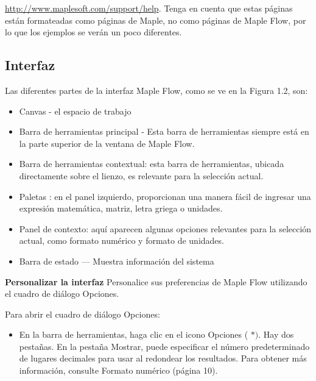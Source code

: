 \href{http://www.maplesoft.com/support/help}{http://www.maplesoft.com/support/help}. Tenga en cuenta que estas páginas están formateadas como páginas de Maple, no como páginas de Maple Flow, por lo que los ejemplos se verán un poco diferentes.

\subsection{Interfaz}
Las diferentes partes de la interfaz Maple Flow, como se ve en la Figura 1.2, son:

\begin{itemize}
  \item Canvas - el espacio de trabajo

\item Barra de herramientas principal - Esta barra de herramientas siempre está en la parte superior de la ventana de Maple Flow.

\item Barra de herramientas contextual: esta barra de herramientas, ubicada directamente sobre el lienzo, es relevante para la selección actual.

\item Paletas : en el panel izquierdo, proporcionan una manera fácil de ingresar una expresión matemática, matriz, letra griega o unidades.

\item Panel de contexto: aquí aparecen algunas opciones relevantes para la selección actual, como formato numérico y formato de unidades.

\item Barra de estado — Muestra información del sistema
\end{itemize}

\textbf{Personalizar la interfaz}
Personalice sus preferencias de Maple Flow utilizando el cuadro de diálogo Opciones.

Para abrir el cuadro de diálogo Opciones:

\begin{itemize}
  \item En la barra de herramientas, haga clic en el icono Opciones ( $\boldsymbol{*})$. Hay dos pestañas. En la pestaña Mostrar, puede especificar el número predeterminado de lugares decimales para usar al redondear los resultados. Para obtener más información, consulte Formato numérico (página 10).
\end{itemize}

